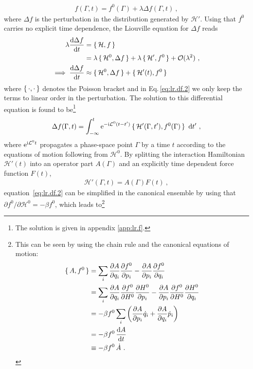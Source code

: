 \begin{align}
  f (\Gamma, t) = f^0(\Gamma) + \lambda \Delta f (\Gamma, t)~,
  \label{eq:lr.f}
\end{align}
where $\Delta f$ is the perturbation in the distribution generated by $\mathcal  H'$. Using that $f^0$ carries no explicit time dependence, the Liouville equation for $\Delta f$ reads
\begin{align}
  \lambda \frac{\d \Delta f}{\d t}
    &= \set{\mathcal  H, f} \nonumber \\
    &= \lambda \set{\mathcal H^0, \Delta f} 
      + \lambda \set{\mathcal H', f^0}
      + \mathcal{O}(\lambda^2)~,
  \label{eq:lr.df.1} \\
  \implies
    \frac{\d \Delta f}{\d t}
      &\approx \set{\mathcal H^0 , \Delta f} + \set{\mathcal H' (t), f^0}
  \label{eq:lr.df.2}
\end{align}
where $\set{\cdot , \cdot}$ denotes the Poisson bracket
and in Eq.\,\eqref{eq:lr.df.2} we only keep the terms to linear order in the perturbation.
The solution to this differential equation is found to be\footnote{The solution is given in appendix \ref{app:lr.f}.}~\cite{Kubo1957a}
\begin{align}
  \Delta f (\Gamma, t) 
    = \int_{-\infty}^t {\rm e}^{-\im \mathcal  L^0 (t - t')} \set{\mathcal  H' (\Gamma, t'), f^0 (\Gamma)}~\d t'~,
  \label{eq:lr.df(t)}
\end{align}
where ${\rm e}^{{\rm i} \mathcal  L^0 t}$ propagates a phase-space point $\Gamma$ by a time $t$ according to the equations of motion following from $\mathcal H^0$.
By splitting the interaction Hamiltonian $\mathcal H'(t)$ into an operator part $ A(\Gamma)$ and an explicitly time dependent force function $F(t)$,
\begin{align}
  \mathcal H' (\Gamma, t)= A (\Gamma) F(t)~,
  \label{eq:lr.H_AF}
\end{align}
equation~\eqref{eq:lr.df.2} can be simplified in the canonical ensemble by using that \mbox{$\partial f^0 / \partial \mathcal H^0 = -\beta f^0$}, which leads to\footnote{This can be seen by using the chain rule and the canonical equations of motion:	
\begin{align*}
	\set{A, f^0}
	&= \sum_i \frac{\partial A}{\partial q_i} \frac{\partial f^0}{\partial p_i}
	- \frac{\partial A}{\partial p_i} \frac{\partial f^0}{\partial q_i} \\
	&= \sum_i \frac{\partial A}{\partial q_i} \frac{\partial f^0}{\partial H^0} \frac{\partial H^0}{\partial p_i}
	- \frac{\partial A}{\partial p_i} \frac{\partial f^0}{\partial H^0} \frac{\partial H^0}{\partial q_i} \\
	&= -\beta f^0 \sum_i
	\left( \frac{\partial A}{\partial p_i} \dot{q}_i +  \frac{\partial A}{\partial q_i} \dot{p}_i \right) \\
	&= -\beta f^0 \, \frac{{\rm d} A}{{\rm d} t} \\
	&\equiv -\beta f^0 \, \dot A~.
	\end{align*}}
